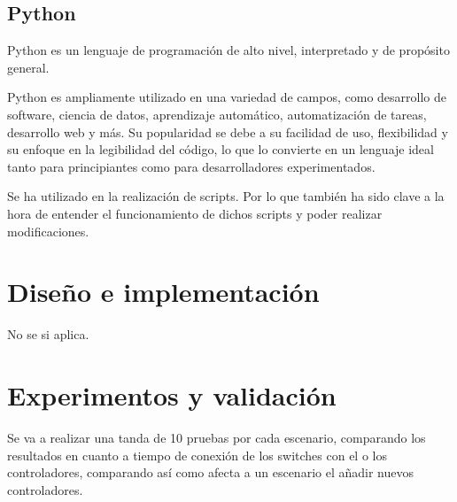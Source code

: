 \documentclass[a4paper, 12pt]{book}
\begin{document}
	\section{Python} 
	\label{sec:python}
	
	Python es un lenguaje de programación de alto nivel, interpretado y de propósito general. 
	
	Python es ampliamente utilizado en una variedad de campos, como desarrollo de software, ciencia de datos, aprendizaje automático, automatización de tareas, desarrollo web y más. Su popularidad se debe a su facilidad de uso, flexibilidad y su enfoque en la legibilidad del código, lo que lo convierte en un lenguaje ideal tanto para principiantes como para desarrolladores experimentados.
	
	Se ha utilizado en la realización de scripts. Por lo que también ha sido clave a la hora de entender el funcionamiento de dichos scripts y poder realizar modificaciones.
	
	
	\cleardoublepage
	\chapter{Diseño e implementación}
	\label{sec:diseno}
	 
	 No se si aplica.
	
	
	
	
	\cleardoublepage
	\chapter{Experimentos y validación}
	\label{chap:experimentos}
	
 	Se va a realizar una tanda de 10 pruebas por cada escenario, comparando los resultados en cuanto a tiempo de conexión de los switches con el o los controladores, comparando así como afecta a un escenario el añadir nuevos controladores.
	
\end{document}
